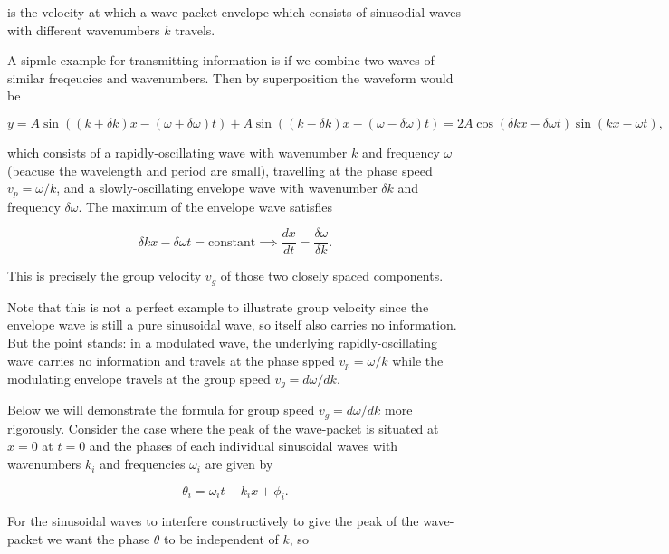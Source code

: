 \documentclass[a4paper,12pt]{report}
\begin{document}
is the velocity at which a wave-packet envelope which consists of sinusodial waves with different wavenumbers \(k\) travels. 

A sipmle example for transmitting information is if we combine two waves of similar freqeucies and wavenumbers. Then by superposition the waveform would be 

\begin{equation}
	y = A\sin \left( (k+\delta k)x - (\omega +\delta \omega )t \right) + A \sin \left( (k-\delta k)x - (\omega - \delta \omega )t \right) = 2A \cos (\delta kx - \delta \omega t) \sin (kx - \omega t),
\end{equation}

which consists of a rapidly-oscillating wave with wavenumber \(k\) and frequency \(\omega \) (beacuse the wavelength and period are small), travelling at the phase speed \(v_{p} = \omega /k \), and a slowly-oscillating envelope wave with wavenumber \(\delta k\) and frequency \(\delta \omega \). The maximum of the envelope wave satisfies 

\begin{equation}
	\delta k x - \delta \omega t = \text{constant} \implies \frac{dx}{dt} = \frac{\delta \omega }{\delta k}.   
\end{equation}

This is precisely the group velocity \(v_{g} \) of those two closely spaced components. 

Note that this is not a perfect example to illustrate group velocity since the envelope wave is still a pure sinusoidal wave, so itself also carries no information. But the point stands: in a modulated wave, the underlying rapidly-oscillating wave carries no information and travels at the phase spped \(v_{p} = \omega /k \) while the modulating envelope travels at the group speed \(v_{g} = d \omega /dk \). 

Below we will demonstrate the formula for group speed \(v_{g} = d \omega /dk  \) more rigorously. Consider the case where the peak of the wave-packet is situated at \(x = 0\) at \(t = 0\) and the phases of each individual sinusoidal waves with wavenumbers \(k_{i} \) and frequencies \(\omega _{i} \) are given by 

\begin{equation}
	\theta _{i} =  \omega _{i}t - k_{i}x + \phi _{i}.
\end{equation}

For the sinusoidal waves to interfere constructively to give the peak of the wave-packet we want the phase \(\theta \) to be independent of \(k\), so 
\end{document}
